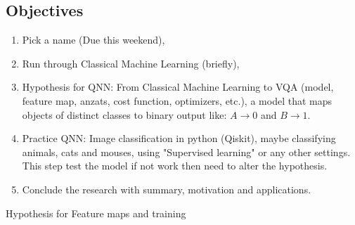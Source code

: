 \subsection{Objectives}
\begin{enumerate}
    \item Pick a name (Due this weekend),
    \item Run through Classical Machine Learning (briefly),
    \item Hypothesis for QNN: From Classical Machine Learning to VQA (model, feature map, anzats, cost function, optimizers, etc.), a model that maps objects of distinct classes to binary output like: $A \to 0$ and $B \to 1$.
    \item Practice QNN: Image classification in python (Qiskit), maybe classifying animals, cats and mouses, using "Supervised learning" or any other settings. This step test the model if not work then need to alter the hypothesis.
    \item Conclude the research with summary, motivation and applications.
\end{enumerate}

Hypothesis for Feature maps and training

